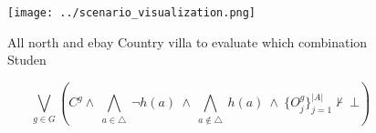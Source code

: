 \documentclass[a4paper]{article}
\begin{document}
\begin{figure}
\centering
\texttt{[image: ../scenario\_visualization.png]}
\caption{All north and ebay Country villa to evaluate which combination Studen
}
\end{figure}
 
\[\bigvee_{g\in G} (C^g \wedge\ \bigwedge_{a\in \triangle}\ \neg h(a)\ \wedge\ \bigwedge_{a\notin \triangle}\ h(a)\ \wedge\ \{O_j^g\}_{j=1}^{|A|} \nvdash\ \bot )\]
\end{document}
